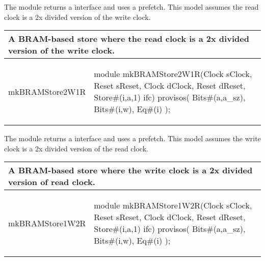 
The  module returns a  interface and uses a
prefetch.  This model assumes the read clock is a 2x divided version
of the write clock.

\begin{center}
\begin{tabular}{|p{1.4 in}|p{4.1 in}|}
 \hline
\multicolumn{2}{|l|}{A BRAM-based store where the
read clock is a 2x divided version of the write clock.}\\
\hline
\begin{libverbatim}mkBRAMStore2W1R
\end{libverbatim} 
& \begin{libverbatim}
module mkBRAMStore2W1R(Clock sClock, Reset sReset, 
                       Clock dClock, Reset dReset, 
                       Store#(i,a,1) ifc)
   provisos( Bits#(a,a_sz), Bits#(i,w), Eq#(i) );\end{libverbatim}
\\
\hline
\end{tabular}
\end{center}


The  module returns a  interface and uses a
prefetch.  This model assumes the write clock is a 2x divided version
of the read clock.

\begin{center}
\begin{tabular}{|p{1.4 in}|p{4.1 in}|}
 \hline
\multicolumn{2}{|l|}{A BRAM-based store where the
write clock is a 2x divided version of read clock.}\\
\hline
\begin{libverbatim}mkBRAMStore1W2R
\end{libverbatim} 
& \begin{libverbatim}
module mkBRAMStore1W2R(Clock sClock, Reset sReset, 
                       Clock dClock, Reset dReset, 
                       Store#(i,a,1) ifc)
   provisos( Bits#(a,a_sz), Bits#(i,w), Eq#(i) );\end{libverbatim}
\\
\hline
\end{tabular}
\end{center}


